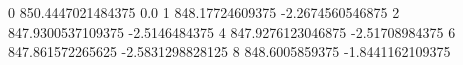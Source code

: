 0 850.4447021484375 0.0
1 848.17724609375 -2.2674560546875
2 847.9300537109375 -2.5146484375
4 847.9276123046875 -2.51708984375
6 847.861572265625 -2.5831298828125
8 848.6005859375 -1.8441162109375
